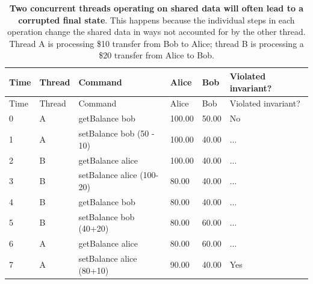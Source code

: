\documentclass[]{article}
\begin{document}
\begin{longtable}[c]{@{}llllll@{}}
\caption{\textbf{Two concurrent threads operating on shared data will often lead to a corrupted final state}.
This happens because the individual steps in each operation change the
shared data in ways not accounted for by the other thread. Thread A is
processing \$10 transfer from Bob to Alice; thread B is processing a
\$20 transfer from Alice to Bob.}\tabularnewline
\toprule
Time & Thread & Command & Alice & Bob & Violated
invariant?\tabularnewline
\midrule
\endfirsthead
\toprule
Time & Thread & Command & Alice & Bob & Violated
invariant?\tabularnewline
\midrule
\endhead
0 & A & getBalance bob & 100.00 & 50.00 & No\tabularnewline
1 & A & setBalance bob (50 - 10) & 100.00 & 40.00 & ...\tabularnewline
2 & B & getBalance alice & 100.00 & 40.00 & ...\tabularnewline
3 & B & setBalance alice (100-20) & 80.00 & 40.00 & ...\tabularnewline
4 & B & getBalance bob & 80.00 & 40.00 & ...\tabularnewline
5 & B & setBalance bob (40+20) & 80.00 & 60.00 & ...\tabularnewline
6 & A & getBalance alice & 80.00 & 60.00 & ...\tabularnewline
7 & A & setBalance alice (80+10) & 90.00 & 40.00 & Yes\tabularnewline
\bottomrule
\end{longtable}

\doublespacing
\end{document}
